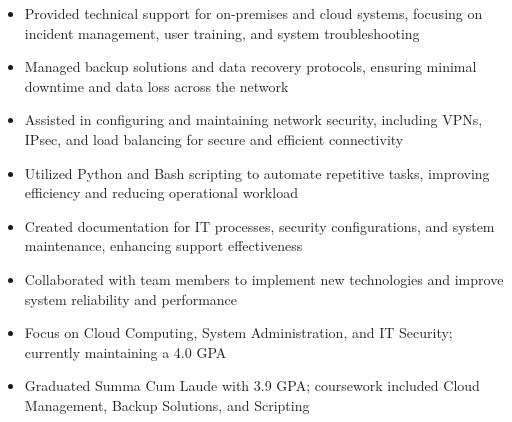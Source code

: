 \par\smallskip
\noindent
\begin{minipage}{20cm}
  \begin{minipage}{9.75cm}
    \begin{itemize}
      \item Provided technical support for on-premises and cloud systems, focusing on incident management, user training, and system troubleshooting
      \item Managed backup solutions and data recovery protocols, ensuring minimal downtime and data loss across the network
      \item Assisted in configuring and maintaining network security, including VPNs, IPsec, and load balancing for secure and efficient connectivity
    \end{itemize}
  \end{minipage}
  \hfill
  \begin{minipage}{9.75cm}
    \begin{itemize}
      \item Utilized Python and Bash scripting to automate repetitive tasks, improving efficiency and reducing operational workload
      \item Created documentation for IT processes, security configurations, and system maintenance, enhancing support effectiveness
      \item Collaborated with team members to implement new technologies and improve system reliability and performance
    \end{itemize}
  \end{minipage}
\end{minipage}

\begin{itemize}
  \item Focus on Cloud Computing, System Administration, and IT Security; currently maintaining a 4.0 GPA
\end{itemize}
\divider

\begin{itemize}
  \item Graduated Summa Cum Laude with 3.9 GPA; coursework included Cloud Management, Backup Solutions, and Scripting
\end{itemize}

